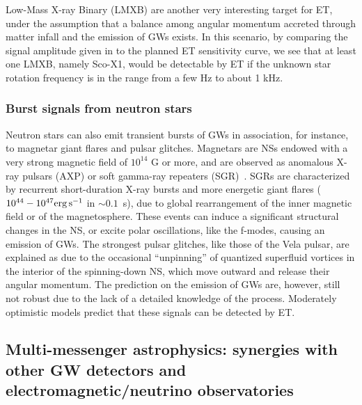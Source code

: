 Low-Mass X-ray Binary (LMXB) are another very interesting target for ET, under the assumption that a balance among angular momentum accreted through matter infall and the emission of GWs exists. In this scenario, by comparing the signal amplitude given in \cite{Bildsten:1998ey} to the planned ET sensitivity curve, we see   that at least one LMXB, namely Sco-X1, would be detectable by ET if the unknown star rotation frequency is in the range from a few Hz to about 1 kHz.







\subsubsection{Burst signals from neutron stars}
Neutron stars can also emit transient bursts of GWs in association, for instance, to magnetar giant flares and pulsar glitches. Magnetars are NSs endowed with a very strong magnetic field of $10^{14}$ G or more, and are observed as anomalous X-ray pulsars (AXP) or soft gamma-ray repeaters (SGR)~\cite{Duncan:1992hi}. SGRs are characterized by recurrent short-duration X-ray bursts and more energetic giant flares ($10^{44}-10^{47} {\rm erg}\,  {\rm s}^{-1}$ in $\sim 0.1$~s), due to global rearrangement of the inner magnetic field or of the magnetosphere. These events can induce a significant structural changes in the NS,  or excite polar oscillations, like the f-modes, causing an emission of GWs. The
strongest pulsar glitches, like those of the Vela pulsar, are explained as due to the occasional ``unpinning'' of quantized superfluid vortices in the interior of the spinning-down NS, which move outward and release their angular momentum. The prediction on the emission of GWs are, however, still not robust due to the lack of a detailed knowledge of the process. Moderately optimistic models predict that these signals can be detected by ET. 



\subsection{Multi-messenger astrophysics: synergies with other GW detectors and electromagnetic/neutrino observatories}
\label{sec:MM}


